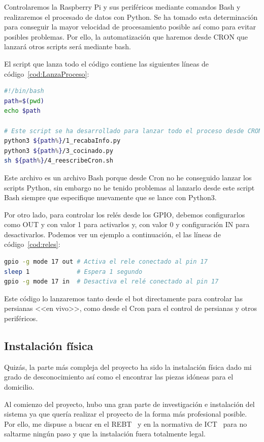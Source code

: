 Controlaremos la Raspberry Pi y sus periféricos mediante comandos Bash y realizaremos el procesado de datos con Python. Se ha tomado esta determinación para conseguir la mayor velocidad de procesamiento posible así como para evitar posibles problemas. Por ello, la automatización que haremos desde CRON que lanzará otros scripts será mediante bash. 

El script que lanza todo el código contiene las siguientes líneas de código~\ref{cod:LanzaProceso}:

\begin{lstlisting}[language=sh, caption={Script que lanza el proceso automático completo.}, label={cod:LanzaProceso}]
#!/bin/bash
path=$(pwd)
echo $path

# Este script se ha desarrollado para lanzar todo el proceso desde CRON.
python3 ${path%}/1_recabaInfo.py
python3 ${path%}/3_cocinado.py
sh ${path%}/4_reescribeCron.sh
\end{lstlisting}

Este archivo es un archivo Bash porque desde Cron no he conseguido lanzar los scripts Python, sin embargo no he tenido problemas al lanzarlo desde este script Bash siempre que especifique nuevamente que se lance con Python3.

Por otro lado, para controlar los relés desde los GPIO, debemos configurarlos como OUT y con valor 1 para activarlos y, con valor 0 y configuración IN para desactivarlos. Podemos ver un ejemplo a continuación, el las líneas de código~\ref{cod:reles}:
\begin{lstlisting}[language=sh, caption={Ejemplo activación y desactivación de relé.}, label={cod:reles}]
gpio -g mode 17 out # Activa el rele conectado al pin 17
sleep 1             # Espera 1 segundo
gpio -g mode 17 in  # Desactiva el relé conectado al pin 17
\end{lstlisting}

Este código lo lanzaremos tanto desde el bot directamente para controlar las persianas <<en vivo>>, como desde el Cron para el control de persianas y otros periféricos.

\subsection{Instalación física}
Quizás, la parte más compleja del proyecto ha sido la instalación física dado mi grado de desconocimiento así como el encontrar las piezas idóneas para el domicilio.

Al comienzo del proyecto, hubo una gran parte de investigación e instalación del sistema ya que quería realizar el proyecto de la forma más profesional posible. Por ello, me dispuse a bucar en el REBT~\cite{manual:REBT} y en la normativa de ICT~\cite{manual:ICT-BT-21} para no saltarme ningún paso y que la instalación fuera totalmente legal.

